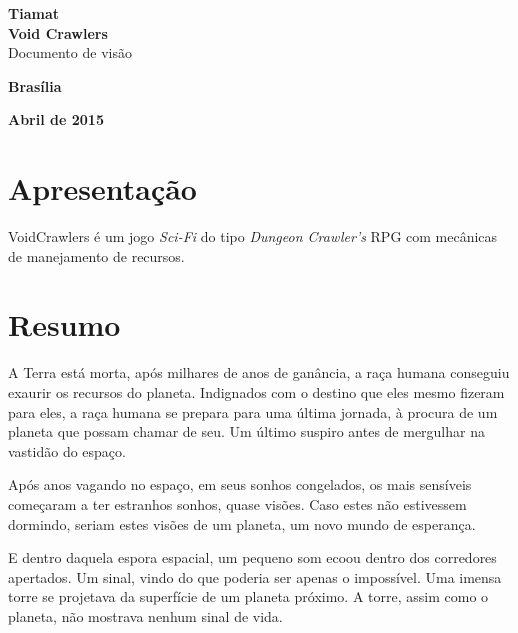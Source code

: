 \documentclass[11pt]{article} %
\begin{document}
\begin{titlepage}
 \vfill
  \begin{center}
   {\large \textbf{Tiamat}} \\
   {\large \textbf{Void Crawlers}}\\[6cm]


   {\Large Documento de visão}\\[6cm]

   \hspace{.45\textwidth} %
  \vfill

\vspace{2cm}

\large \textbf{Brasília}

\large \textbf{Abril de 2015}
\end{center}
\end{titlepage}
\newpage

\section*{Apresentação}

VoidCrawlers é um jogo \textit{Sci-Fi} do tipo \textit{Dungeon Crawler's} RPG com mecânicas de manejamento de recursos.

\section*{Resumo}

A Terra está morta, após milhares de anos de ganância, a raça humana conseguiu exaurir os recursos do planeta.  Indignados com o destino que eles mesmo fizeram para eles, a raça humana se prepara para uma última jornada, à procura de um planeta que possam chamar de seu. Um  último suspiro antes de mergulhar na vastidão do espaço.

Após anos vagando no espaço, em seus sonhos congelados, os mais sensíveis começaram a ter estranhos sonhos, quase visões. Caso estes não estivessem dormindo, seriam estes visões de um planeta, um novo mundo de esperança.

E dentro daquela espora espacial, um pequeno som ecoou dentro dos corredores apertados. Um sinal, vindo do que poderia ser apenas o impossível. Uma imensa torre se projetava da superfície de um planeta próximo. A torre, assim como o planeta, não mostrava nenhum sinal de vida.
\end{document}
